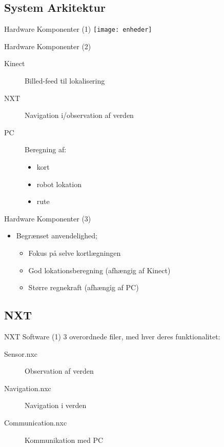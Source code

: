 \subsection{System Arkitektur}

\begin{frame}{Hardware Komponenter (1)}
\texttt{[image: enheder]}
\end{frame}

\begin{frame}{Hardware Komponenter (2)}
\begin{description}
\item[Kinect]{Billed-feed til lokalisering}
\item[NXT]{Navigation i/observation af verden}
\item[PC]{Beregning af:}
\begin{itemize}
\item{kort}
\item{robot lokation}
\item{rute}
\end{itemize}
\end{description}
\end{frame}

\begin{frame}{Hardware Komponenter (3)}
\begin{itemize}
\item{Begrænset anvendelighed;}
\begin{itemize}
\item{Fokus på selve kortlægningen}
\item{God lokationsberegning (afhængig af Kinect)}
\item{Større regnekraft (afhængig af PC)}
\end{itemize}
\end{itemize}
\end{frame}

\subsection{NXT}

\begin{frame}{NXT Software (1)}
3 overordnede filer, med hver deres funktionalitet:
\begin{description}
\item[Sensor.nxc]{Observation af verden}
\item[Navigation.nxc]{Navigation i verden}
\item[Communication.nxc]{Kommunikation med PC}
\end{description}
\end{frame}

